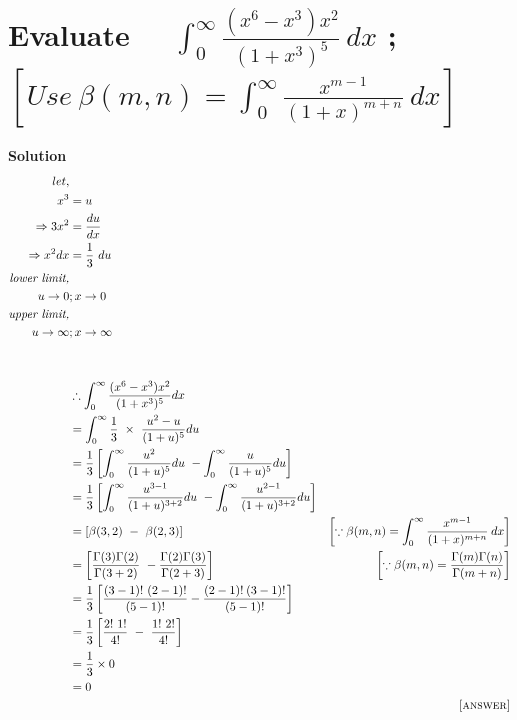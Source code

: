 \documentclass[12pt]{article}
\begin{document}
\section{Evaluate \ \ $\int_{0}^{\infty} \frac{(x^6-x^3)x^2}{(1+x^3)^5}\ dx$ ; \ $\left[ Use \ \beta (m,n)= \int_{0}^{\infty} \frac{x^{m-1}}{(1+x)^{m+n}} \ dx \right]$}
\textbf{Solution}
\begin{align*}
    let,\\
    x^3 &= u\\
    \Rightarrow 3x^2 &= \frac{du}{dx}\\
    \Rightarrow x^2 dx &= \frac{1}{3} \ du\\
     \textit{lower limit,} &\\
    u\rightarrow 0 &; x \rightarrow 0 \\
     \textit{upper limit,} &\\
    u \rightarrow \infty &; x \rightarrow \infty\\\\\\
    &\therefore \int_{0}^{\infty} \frac{(x^6-x^3)x^2}{(1+x^3)^5} dx\\
    &= \int_{0}^{\infty} \frac{1}{3} \ \times \ \frac{u^2-u}{(1+u)^5} du \\
    &= \frac{1}{3} \left[ \int_{0}^{\infty} \frac{u^{2}}{(1+u)^{5}} du \ - \int_{0}^{\infty} \frac{u}{(1+u)^{5}} du \right]\\
    &= \frac{1}{3} \left[ \int_{0}^{\infty} \frac{u^{3-1}}{(1+u)^{3+2}} du \ - \int_{0}^{\infty} \frac{u^{2-1}}{(1+u)^{3+2}} du \right]\\
    &= \left[\beta(3,2) \ - \ \beta(2,3) \right] & \left[\because \beta(m,n) = \int_{0}^{\infty} \frac{x^{m-1}}{(1+x)^{m+n}}\: dx\right]\\
    &= \left[\frac{\Gamma(3)\Gamma(2)}{\Gamma(3+2)} \ -  \frac{\Gamma(2) \Gamma(3)}{\Gamma (2+3)} \right] & \left[\because \beta(m,n) = \frac{\Gamma(m) \Gamma(n)}{\Gamma (m+n)}  \right]\\
    &= \frac{1}{3} \left[\frac{(3-1)! \ (2-1)!}{(5-1)!} - \frac{(2-1)!\:(3-1)!}{(5-1)!}\right]\\
    &= \frac{1}{3} \left[\frac{2! \ 1!}{4!} \ - \ \frac{1! \ 2! }{4!} \right]\\
    &= \frac{1}{3} \times 0\\
    &= 0 \\
    & &\textsc{[answer]}
\end{align*}

\pagebreak

\end{document}
